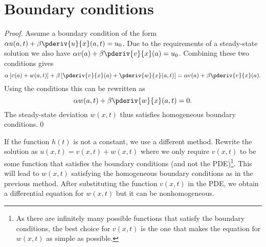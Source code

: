 \section{Boundary conditions}


    \begin{proof}
        Assume a boundary condition of the form $\alpha u(a,t) + \beta\pderiv{u}{x}(a,t) = u_0$. Due to the requirements of a steady-state solution we also have $\alpha v(a) + \beta\pderiv{v}{x}(a) = u_0$. Combining these two conditions gives \[\alpha\left[v(a) + w(a,t)\right] + \beta\left[\pderiv{v}{x}(a) + \pderiv{w}{x}(a,t)\right] = \alpha v(a) + \beta\pderiv{v}{x}(a).\] Using the conditions this can be rewritten as \[\alpha w(a,t) + \beta\pderiv{w}{x}(a,t) = 0.\] The steady-state deviation $w(x,t)$ thus satisfies homogeneous boundary conditions.\qed
    \end{proof}

    \begin{method}
        If the function $h(t)$ is not a constant, we use a different method. Rewrite the solution as $u(x,t) = v(x,t) + w(x,t)$ where we only require $v(x,t)$ to be some function that satisfies the boundary conditions (and not the PDE)\footnote{As there are infinitely many possible functions that satisfy the boundary conditions, the best choice for $v(x,t)$ is the one that makes the equation for $w(x,t)$ as simple as possible.}. This will lead to $w(x,t)$ satisfying the homogeneous boundary conditions as in the previous method. After substituting the function $v(x,t)$ in the PDE, we obtain a differential equation for $w(x,t)$ but it can be nonhomogeneous.
    \end{method}

